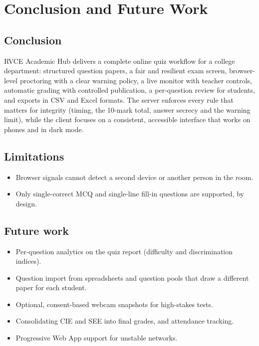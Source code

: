 \documentclass[12pt,a4paper,oneside]{report}
\newcommand{\appname}{RVCE Academic Hub}
\begin{document}
\chapter{Conclusion and Future Work}
\label{ch:concl}

\section{Conclusion}
\appname{} delivers a complete online quiz workflow for a college department: structured question papers, a fair and
resilient exam screen, browser-level proctoring with a clear warning policy, a live monitor with teacher controls,
automatic grading with controlled publication, a per-question review for students, and exports in CSV and Excel
formats. The server enforces every rule that matters for integrity (timing, the 10-mark total, answer secrecy and the
warning limit), while the client focuses on a consistent, accessible interface that works on phones and in dark mode.

\section{Limitations}
\begin{itemize}
  \item Browser signals cannot detect a second device or another person in the room.
  \item Only single-correct MCQ and single-line fill-in questions are supported, by design.
\end{itemize}

\section{Future work}
\begin{itemize}
  \item Per-question analytics on the quiz report (difficulty and discrimination indices).
  \item Question import from spreadsheets and question pools that draw a different paper for each student.
  \item Optional, consent-based webcam snapshots for high-stakes tests.
  \item Consolidating CIE and SEE into final grades, and attendance tracking.
  \item Progressive Web App support for unstable networks.
\end{itemize}
\end{document}
